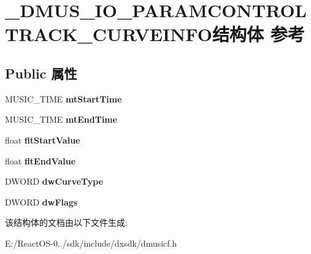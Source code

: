 \hypertarget{struct___d_m_u_s___i_o___p_a_r_a_m_c_o_n_t_r_o_l_t_r_a_c_k___c_u_r_v_e_i_n_f_o}{}\section{\+\_\+\+D\+M\+U\+S\+\_\+\+I\+O\+\_\+\+P\+A\+R\+A\+M\+C\+O\+N\+T\+R\+O\+L\+T\+R\+A\+C\+K\+\_\+\+C\+U\+R\+V\+E\+I\+N\+F\+O结构体 参考}
\label{struct___d_m_u_s___i_o___p_a_r_a_m_c_o_n_t_r_o_l_t_r_a_c_k___c_u_r_v_e_i_n_f_o}
\subsection*{Public 属性}
\begin{DoxyCompactItemize}
\item 
\mbox{\label{struct___d_m_u_s___i_o___p_a_r_a_m_c_o_n_t_r_o_l_t_r_a_c_k___c_u_r_v_e_i_n_f_o_a6477aa2a8c5e8ad1f7ef83513a23f4f3}} 
M\+U\+S\+I\+C\+\_\+\+T\+I\+ME {\bfseries mt\+Start\+Time}
\item 
\mbox{\label{struct___d_m_u_s___i_o___p_a_r_a_m_c_o_n_t_r_o_l_t_r_a_c_k___c_u_r_v_e_i_n_f_o_a0b0c283ef76dff5794b176c4f4df9b8e}} 
M\+U\+S\+I\+C\+\_\+\+T\+I\+ME {\bfseries mt\+End\+Time}
\item 
\mbox{\label{struct___d_m_u_s___i_o___p_a_r_a_m_c_o_n_t_r_o_l_t_r_a_c_k___c_u_r_v_e_i_n_f_o_a0e0972bafa2a9b54d81b7c048ca9b76b}} 
float {\bfseries flt\+Start\+Value}
\item 
\mbox{\label{struct___d_m_u_s___i_o___p_a_r_a_m_c_o_n_t_r_o_l_t_r_a_c_k___c_u_r_v_e_i_n_f_o_aad402191c7039c1ae6721ab0805a0479}} 
float {\bfseries flt\+End\+Value}
\item 
\mbox{\label{struct___d_m_u_s___i_o___p_a_r_a_m_c_o_n_t_r_o_l_t_r_a_c_k___c_u_r_v_e_i_n_f_o_ad190b4a733866b6613e0588692873303}} 
D\+W\+O\+RD {\bfseries dw\+Curve\+Type}
\item 
\mbox{\label{struct___d_m_u_s___i_o___p_a_r_a_m_c_o_n_t_r_o_l_t_r_a_c_k___c_u_r_v_e_i_n_f_o_a14a6af63940db5523e69abee0787a870}} 
D\+W\+O\+RD {\bfseries dw\+Flags}
\end{DoxyCompactItemize}


该结构体的文档由以下文件生成\+:\begin{DoxyCompactItemize}
\item 
E\+:/\+React\+O\+S-\/0../sdk/include/dxsdk/dmusicf.\+h\end{DoxyCompactItemize}
